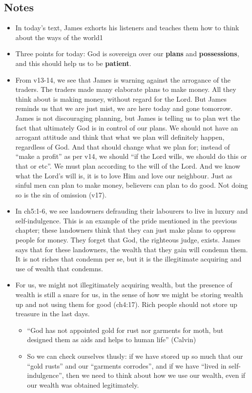 \subsection*{Notes}
\begin{itemize}
  \item In today’s text, James exhorts his listeners and teaches them how to think about the ways of the world1
  \item Three points for today: God is sovereign over our \textbf{plans} and \textbf{possessions}, and this should help us to be \textbf{patient}.
  \item From v13-14, we see that James is warning against the arrogance of the traders. The traders made many elaborate plans to make money. All they think about is making money, without regard for the Lord. But James reminds us that we are just mist, we are here today and gone tomorrow. James is not discouraging planning, but James is telling us to plan wrt the fact that ultimately God is in control of our plans. We should not have an arrogant attitude and think that what we plan will definitely happen, regardless of God. And that should change what we plan for; instead of “make a profit” as per v14, we should “if the Lord wills, we should do this or that or etc”. We must plan according to the will of the Lord. And we know what the Lord’s will is, it is to love Him and love our neighbour. Just as sinful men can plan to make money, believers can plan to do good. Not doing so is the sin of omission (v17).
  \item In ch5:1-6, we see landowners defrauding their labourers to live in luxury and self-indulgence. This is an example of the pride mentioned in the previous chapter; these landowners think that they can just make plans to oppress people for money. They forget that God, the righteous judge, exists. James says that for these landowners, the wealth that they gain will condemn them. It is not riches that condemn per se, but it is the illegitimate acquiring and use of wealth that condemns.
  \item For us, we might not illegitimately acquiring wealth, but the presence of wealth is still a snare for us, in the sense of how we might be storing wealth up and not using them for good (ch4:17). Rich people should not store up treasure in the last days.
  \begin{itemize}
    \item “God has not appointed gold for rust nor garments for moth, but designed them as aids and helps to human life” (Calvin)
    \item So we can check ourselves thusly: if we have stored up so much that our “gold rusts” and our “garments corrodes”, and if we have “lived in self-indulgence”, then we need to think about how we use our wealth, even if our wealth was obtained legitimately. 

\end{itemize}
\end{itemize}

